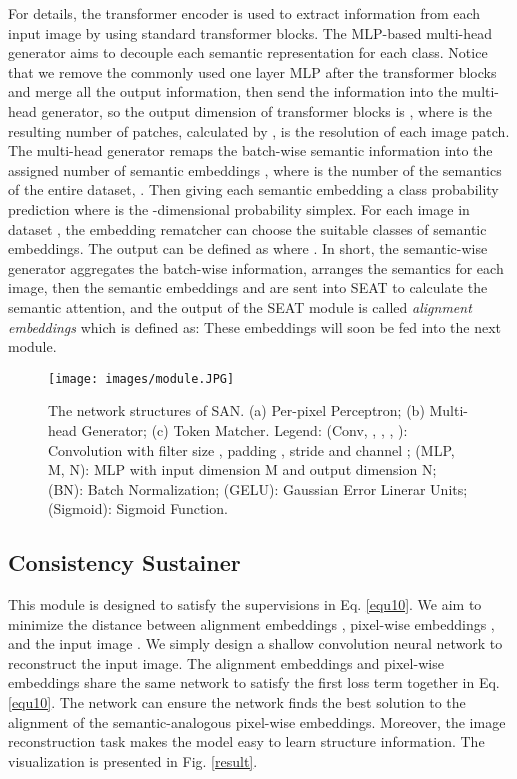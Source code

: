 \documentclass[letterpaper]{article} \usepackage{aaai23}  \usepackage{times}  \usepackage{helvet}  \usepackage{courier}  \usepackage[hyphens]{url}  \usepackage{graphicx} \urlstyle{rm} \def\UrlFont{\rm}  \usepackage{natbib}  \usepackage{caption} \frenchspacing  \setlength{\pdfpagewidth}{8.5in}  \setlength{\pdfpageheight}{11in}  \usepackage{algorithm}
\begin{document}
For details, the transformer encoder is used to extract information from each input image by using standard transformer blocks. The MLP-based multi-head generator aims to decouple each semantic representation for each class. Notice that we remove the commonly used one layer MLP after the transformer blocks and merge all the output information, then send the information into the multi-head generator, so the output dimension of transformer blocks is , where  is the resulting number of patches, calculated by ,  is the resolution of each image patch. The multi-head generator remaps the batch-wise semantic information into the assigned number of semantic embeddings , where  is the number of the semantics of the entire dataset, . Then giving each semantic embedding a class probability prediction  where  is the -dimensional probability simplex. For each image in dataset , the embedding rematcher can choose the suitable classes of semantic embeddings. The output can be defined as  where . In short, the semantic-wise generator aggregates the batch-wise information, arranges the semantics for each image, then the semantic embeddings  and  are sent into SEAT to calculate the semantic attention, and the output of the SEAT module is called \textit{alignment embeddings} which is defined as:  These embeddings will soon be fed into the next module.


\begin{figure}[t]
\centering
\texttt{[image: images/module.JPG]} \caption{{ The network structures of SAN.} (a) Per-pixel Perceptron; (b) Multi-head Generator; (c) Token Matcher. { Legend}: (Conv, , , , ): Convolution with filter size , padding , stride  and channel ; (MLP, M, N): MLP with input dimension M and output dimension N; (BN): Batch Normalization; (GELU): Gaussian Error Linerar Units; (Sigmoid): Sigmoid Function.}
\label{module}
\end{figure}

\subsection{Consistency Sustainer}
This module is designed to satisfy the supervisions in Eq. \ref{equ10}. We aim to minimize the distance between alignment embeddings , pixel-wise embeddings , and the input image . We simply design a shallow  convolution neural network to reconstruct the input image. The alignment embeddings  and pixel-wise embeddings  share the same network to satisfy the first loss term together in Eq. \ref{equ10}. The network can ensure the network finds the best solution to the alignment of the semantic-analogous pixel-wise embeddings. Moreover, the image reconstruction task makes the model easy to learn structure information. The visualization is presented in Fig. \ref{result}. 
\end{document}
